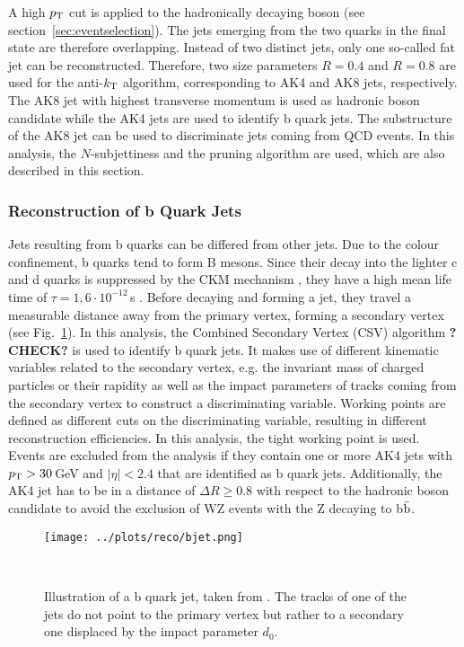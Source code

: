 \noindent A high $p_{\rm T}$ cut is applied to the hadronically decaying boson (see section~\ref{sec:eventselection}). The jets emerging from the two quarks in the final state are therefore overlapping. Instead of two distinct jets, only one so-called fat jet can be reconstructed. Therefore, two size parameters $R=0.4$ and $R=0.8$ are used for the anti-$k_{\rm T}$ algorithm, corresponding to AK4 and AK8 jets, respectively. The AK8 jet with highest transverse momentum is used as hadronic boson candidate while the AK4 jets are used to identify b quark jets. The substructure of the AK8 jet can be used to discriminate jets coming from QCD events. In this analysis, the $N$-subjettiness and the pruning algorithm are used, which are also described in this section.

\subsubsection*{Reconstruction of b Quark Jets}
Jets resulting from b quarks can be differed from other jets. Due to the colour confinement, b quarks tend to form B mesons. Since their decay into the lighter c and d quarks is suppressed by the CKM mechanism \cite{CKM}, they have a high mean life time of $\tau=1,6\cdot 10^{-12}$\,s \cite{SMmasses}. Before decaying and forming a jet, they travel a measurable distance away from the primary vertex, forming a secondary vertex (see Fig.~\ref{fig:reco:bjet}). In this analysis, the Combined Secondary Vertex (CSV) algorithm \cite{CSV}\textbf{?CHECK?} is used to identify b quark jets. It makes use of different kinematic variables related to the secondary vertex, e.g. the invariant mass of charged particles or their rapidity as well as the impact parameters of tracks coming from the secondary vertex to construct a discriminating variable. Working points are defined as different cuts on the discriminating variable, resulting in different reconstruction efficiencies. In this analysis, the tight working point is used. Events are excluded from the analysis if they contain one or more AK4 jets with $p_{\rm T}>30$\,GeV and $|\eta|<2.4$ that are identified as b quark jets. Additionally, the AK4 jet has to be in a distance of $\Delta R \geq 0.8$ with respect to the hadronic boson candidate to avoid the exclusion of WZ events with the Z decaying to b$\bar{\rm b}$.
\begin{figure}
    \centering
    \texttt{[image: ../plots/reco/bjet.png]}
    \caption[Illustration of a b quark jet]{Illustration of a b quark jet, taken from \cite{bjet}. The tracks of one of the jets do not point to the primary vertex but rather to a secondary one displaced by the impact parameter $d_0$.}\
    \label{fig:reco:bjet}
\end{figure}

